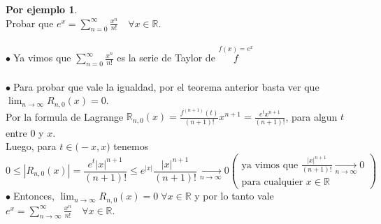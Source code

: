 \documentclass{article}
\theoremstyle{definition}
\newtheorem*{ej}{Por ejemplo}
\theoremstyle{remark}
\newcommand\R{\ensuremath{\mathbb{R}}}
\newcommand\bl{$\bullet\;$}
\begin{document}
\begin{ej} \; \\
  Probar que $e^x = \sum_{n=0}^{\infty}{\frac{x^n}{n!}}\quad \forall x \in \mathbb{R}$.\\\\
  \bl Ya vimos que $\sum_{n=0}^{\infty}{\frac{x^n}{n!}}$ es la serie de Taylor de $\overset{f(x)=e^x}{f}$ \\ \\
  \bl Para probar que vale la igualdad, por el teorema anterior basta ver que $\lim_{n\to\infty}{R_{n,0}(x)=0}$. \\
  Por la formula de Lagrange $\R_{n,0}(x)=\frac{f^{(n+1)}(t)}{(n+1)!}x^{n+1}=\frac{e^tx^{n+1}}{(n+1)!}$, para algun $t$ entre $0$ y $x$. \\
  Luego, para $t \in \big(-x,x\big)$ tenemos \[ 
    0 \leq |R_{n,0}(x)|=\frac{e^t|x|^{n+1}}{(n+1)!} \leq e^{|x|} \frac{|x|^{n+1}}{(n+1)!} \underset{n\to\infty}{\longrightarrow} 0 \left(\begin{array}{l}
        \text{ya vimos que }\frac{|x|^{n+1}}{(n+1)!} \underset{n\to\infty}{\longrightarrow} 0  \\
        \text{para cualquier } x \in \mathbb{R}
    \end{array}\right)
  \]
 \bl Entonces, $\lim_{n\to\infty}{R_{n,0}(x)=0} \; \forall x \in \mathbb{R}$ y por lo tanto vale $e^x=\sum_{n\to\infty}^{\infty}{\frac{x^n}{n!}} \quad \forall x \in \mathbb{R}$.

\end{ej}
\end{document}
